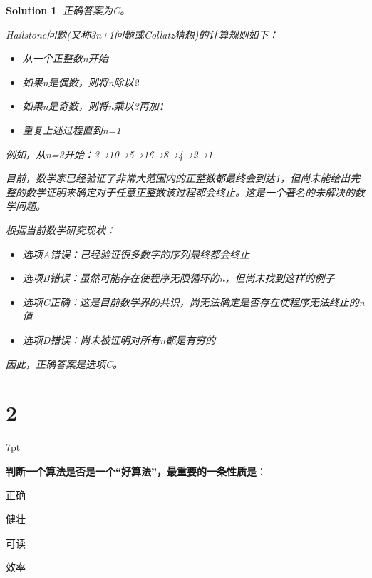 \documentclass[UTF8]{report}
\newtheorem{solution}{Solution}
\theoremstyle{MyLineTheoremStyle} %
\theoremstyle{MyBlockTheoremStyle} %
\theoremstyle{MySubsubsectionStyle} %
\newenvironment{graybox}{%
        \def\FrameCommand{%
        \hspace{1pt}%
        {\color{gray}\small \vrule width 2pt}%
        {\color{graybox_color}\vrule width 4pt}%
        \colorbox{graybox_color}%
        }%
        \MakeFramed{\advance\hsize-\width\FrameRestore}%
        \noindent\hspace{-4.55pt}%
        \begin{adjustwidth}{}{7pt}%
        \vspace{2pt}\vspace{2pt}%
        }
        {%
        \vspace{2pt}\end{adjustwidth}\endMakeFramed%
        }
\begin{document}
\begin{solution}
正确答案为C。

Hailstone问题(又称3n+1问题或Collatz猜想)的计算规则如下：
\begin{itemize}
\item 从一个正整数n开始
\item 如果n是偶数，则将n除以2
\item 如果n是奇数，则将n乘以3再加1
\item 重复上述过程直到n=1
\end{itemize}

例如，从n=3开始：3→10→5→16→8→4→2→1

目前，数学家已经验证了非常大范围内的正整数都最终会到达1，但尚未能给出完整的数学证明来确定对于任意正整数该过程都会终止。这是一个著名的未解决的数学问题。

根据当前数学研究现状：
\begin{itemize}
\item 选项A错误：已经验证很多数字的序列最终都会终止
\item 选项B错误：虽然可能存在使程序无限循环的n，但尚未找到这样的例子
\item 选项C正确：这是目前数学界的共识，尚无法确定是否存在使程序无法终止的n值
\item 选项D错误：尚未被证明对所有n都是有穷的
\end{itemize}

因此，正确答案是选项C。
\end{solution}

\section*{2}

\begin{graybox}
\textbf{判断一个算法是否是一个“好算法”，最重要的一条性质是}：
\begin{circledenum}
    \item 正确
    \item 健壮
    \item 可读
    \item 效率
\end{circledenum}
\end{graybox}
\end{document}
